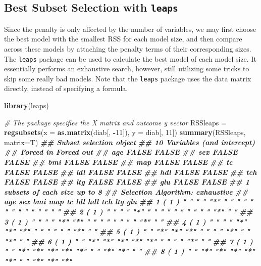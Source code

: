 \documentclass[
]{book}
\newenvironment{Shaded}{\begin{snugshade}}{\end{snugshade}}
\newcommand{\AttributeTok}[1]{\textcolor[rgb]{0.13,0.29,0.53}{#1}}
\newcommand{\CommentTok}[1]{\textcolor[rgb]{0.56,0.35,0.01}{\textit{#1}}}
\newcommand{\DecValTok}[1]{\textcolor[rgb]{0.00,0.00,0.81}{#1}}
\newcommand{\DocumentationTok}[1]{\textcolor[rgb]{0.56,0.35,0.01}{\textbf{\textit{#1}}}}
\newcommand{\FunctionTok}[1]{\textcolor[rgb]{0.13,0.29,0.53}{\textbf{#1}}}
\newcommand{\NormalTok}[1]{#1}
\newcommand{\OtherTok}[1]{\textcolor[rgb]{0.56,0.35,0.01}{#1}}
\newcommand{\SpecialCharTok}[1]{\textcolor[rgb]{0.81,0.36,0.00}{\textbf{#1}}}
\theoremstyle{definition}
\theoremstyle{definition}
\theoremstyle{definition}
\theoremstyle{definition}
\theoremstyle{remark}
\begin{document}
\hypertarget{best-subset-selection-with-leaps}{%
\subsection{\texorpdfstring{Best Subset Selection with \texttt{leaps}}{Best Subset Selection with leaps}}\label{best-subset-selection-with-leaps}}

Since the penalty is only affected by the number of variables, we may first choose the best model with the smallest RSS for each model size, and then compare across these models by attaching the penalty terms of their corresponding sizes. The \texttt{leaps} package can be used to calculate the best model of each model size. It essentially performs an exhaustive search, however, still utilizing some tricks to skip some really bad models. Note that the \texttt{leaps} package uses the data matrix directly, instead of specifying a formula.

\begin{Shaded}
\begin{Highlighting}[]
    \FunctionTok{library}\NormalTok{(leaps)}
    
    \CommentTok{\# The package specifies the X matrix and outcome y vector}
\NormalTok{    RSSleaps }\OtherTok{=} \FunctionTok{regsubsets}\NormalTok{(}\AttributeTok{x =} \FunctionTok{as.matrix}\NormalTok{(diab[, }\SpecialCharTok{{-}}\DecValTok{11}\NormalTok{]), }\AttributeTok{y =}\NormalTok{ diab[, }\DecValTok{11}\NormalTok{])}
    \FunctionTok{summary}\NormalTok{(RSSleaps, }\AttributeTok{matrix=}\NormalTok{T)}
\DocumentationTok{\#\# Subset selection object}
\DocumentationTok{\#\# 10 Variables  (and intercept)}
\DocumentationTok{\#\#     Forced in Forced out}
\DocumentationTok{\#\# age     FALSE      FALSE}
\DocumentationTok{\#\# sex     FALSE      FALSE}
\DocumentationTok{\#\# bmi     FALSE      FALSE}
\DocumentationTok{\#\# map     FALSE      FALSE}
\DocumentationTok{\#\# tc      FALSE      FALSE}
\DocumentationTok{\#\# ldl     FALSE      FALSE}
\DocumentationTok{\#\# hdl     FALSE      FALSE}
\DocumentationTok{\#\# tch     FALSE      FALSE}
\DocumentationTok{\#\# ltg     FALSE      FALSE}
\DocumentationTok{\#\# glu     FALSE      FALSE}
\DocumentationTok{\#\# 1 subsets of each size up to 8}
\DocumentationTok{\#\# Selection Algorithm: exhaustive}
\DocumentationTok{\#\#          age sex bmi map tc  ldl hdl tch ltg glu}
\DocumentationTok{\#\# 1  ( 1 ) " " " " "*" " " " " " " " " " " " " " "}
\DocumentationTok{\#\# 2  ( 1 ) " " " " "*" " " " " " " " " " " "*" " "}
\DocumentationTok{\#\# 3  ( 1 ) " " " " "*" "*" " " " " " " " " "*" " "}
\DocumentationTok{\#\# 4  ( 1 ) " " " " "*" "*" "*" " " " " " " "*" " "}
\DocumentationTok{\#\# 5  ( 1 ) " " "*" "*" "*" " " " " "*" " " "*" " "}
\DocumentationTok{\#\# 6  ( 1 ) " " "*" "*" "*" "*" "*" " " " " "*" " "}
\DocumentationTok{\#\# 7  ( 1 ) " " "*" "*" "*" "*" "*" " " "*" "*" " "}
\DocumentationTok{\#\# 8  ( 1 ) " " "*" "*" "*" "*" "*" " " "*" "*" "*"}
\end{Highlighting}
\end{Shaded}
\end{document}

